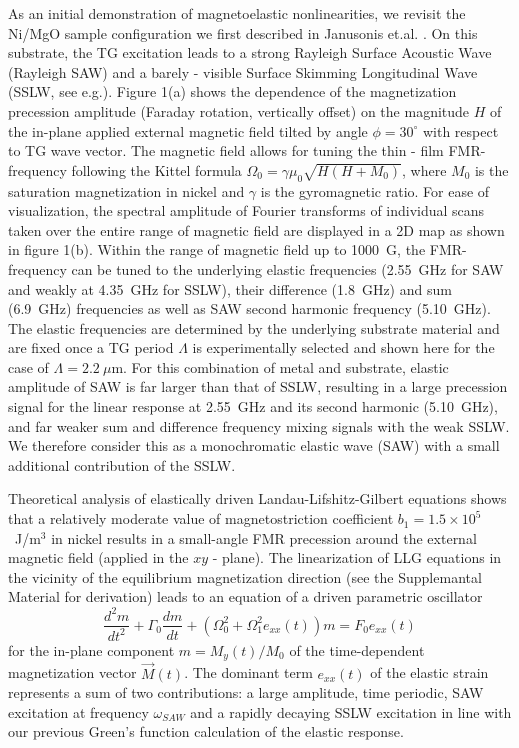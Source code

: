 \documentclass[aps,showpacs,prb,twocolumn,superscriptaddress]{revtex4}
\begin{document}
As an initial demonstration of magnetoelastic nonlinearities, we revisit the Ni/MgO sample configuration we first described in Janusonis et.al. \cite{Janusonis2015}.  On this substrate, the TG excitation leads to a strong Rayleigh Surface Acoustic Wave (Rayleigh SAW) and a barely - visible Surface Skimming Longitudinal Wave (SSLW, see e.g.\cite{Janusonis2016}). Figure 1(a) shows the dependence of the magnetization precession amplitude (Faraday rotation, vertically offset) on the magnitude $H$ of the in-plane applied external magnetic field tilted by angle $\phi=30^{\circ}$ with respect to TG wave vector. The magnetic field allows for tuning the thin - film FMR-frequency following the Kittel formula $\Omega_0=\gamma\mu_0\sqrt{H(H+M_0)}$, where $M_0$ is the saturation magnetization in nickel and $\gamma$ is the gyromagnetic ratio. For ease of visualization, the spectral amplitude of Fourier transforms of individual scans taken over the entire range of magnetic field are displayed in a 2D map as shown in figure 1(b).  Within the range of magnetic field up to 1000~G, the FMR-frequency can be tuned to the underlying elastic frequencies (2.55~GHz for SAW and weakly at 4.35~GHz for SSLW), their difference (1.8~GHz) and sum (6.9~GHz) frequencies as well as SAW second harmonic frequency (5.10~GHz). The elastic frequencies are determined by the underlying substrate material and are fixed once a TG period $\Lambda$ is experimentally selected and shown here for the case of $\Lambda=2.2~\mu$m.  For this combination of metal and substrate, elastic amplitude of SAW is far larger than that of SSLW, resulting in a large precession signal for the linear response at 2.55~GHz and its second harmonic (5.10~GHz), and far weaker sum and difference frequency mixing signals with the weak SSLW. We therefore consider this as a monochromatic elastic wave (SAW) with a small additional contribution of the SSLW.  

Theoretical analysis of elastically driven Landau-Lifshitz-Gilbert equations \cite{Kovalenko} shows that a relatively moderate value of magnetostriction coefficient $b_1=1.5\times10^5$~J/m$^3$ in nickel results in a small-angle FMR precession around the external magnetic field (applied in the $xy$ - plane). The linearization of LLG equations in the vicinity of the equilibrium magnetization direction (see the Supplemantal Material for derivation) leads to an equation of a driven parametric oscillator   
\begin{equation}
\frac{d^2m}{dt^2} + \Gamma_0\frac{dm}{dt}+
(\Omega_0^2+\Omega_1^2e_{xx}(t))m=F_0e_{xx}(t)
\end{equation}
for the in-plane component $m=M_y(t)/M_0$ of the time-dependent magnetization vector $\overrightarrow{M}(t)$. The dominant term $e_{xx}(t)$ of the elastic strain represents a sum of two contributions: a large amplitude, time periodic, SAW excitation at frequency $\omega_{SAW}$  and a rapidly decaying SSLW excitation in line with our previous Green's function calculation of the elastic response\cite{Janusonis2016}.
\end{document}
